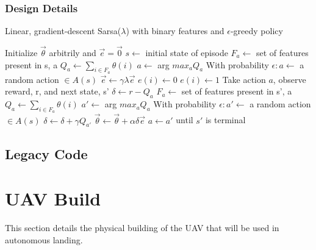 \subsubsection{Design Details}
\begin{algorithm} [h]                     %
\caption{Linear, gradient-descent Sarsa($\lambda$) with binary features and $\epsilon$-greedy policy}         
\label{Sarsa}                           %
\begin{algorithmic}                  %
    \STATE Initialize $\vec{\theta}$ arbitrily and $\vec{e} = \vec{0}$
      \STATE $s \leftarrow$ initial state of episode
        \STATE $F_a \leftarrow$ set of features present in s, a
        \STATE $Q_a \leftarrow \sum_{i \in F_a}\theta(i)$
      \ENDFOR
      \STATE $a \leftarrow$ arg $max_a Q_a$
      \STATE With probability $\epsilon: a \leftarrow$ a random action $\in A(s)$
        \STATE $\vec{e} \leftarrow \gamma \lambda \vec{e}$
            \STATE $e(i) \leftarrow 0 $
          \ENDFOR
        \ENDFOR
          \STATE $e(i) \leftarrow 1 $
        \ENDFOR
        \STATE Take action $a$, observe reward, r, and next state, s'
        \STATE $\delta \leftarrow r - Q_a$
          \STATE $F_a \leftarrow$ set of features present in s', a
          \STATE $Q_a \leftarrow \sum_{i \in F_a}\theta(i)$
        \ENDFOR
        \STATE $a' \leftarrow$ arg $max_a Q_a$
        \STATE With probability $\epsilon:a' \leftarrow$ a random action $\in A(s)$
        \STATE $\delta \leftarrow \delta + \gamma Q_{a'}$
        \STATE $\vec{\theta} \leftarrow \vec{\theta} + \alpha \delta \vec{e}$
        \STATE $a \leftarrow a'$
      \ENDFOR
      \STATE until $s'$ is terminal
    \ENDFOR
\end{algorithmic}
\end{algorithm} 

\subsection{Legacy Code}


\newpage
\section{UAV Build}
This section details the physical building of the UAV that will be used in autonomous landing.
